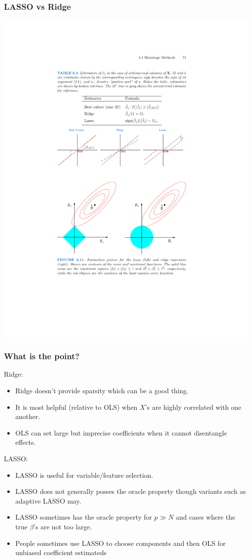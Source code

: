 \documentclass[xcolor=pdftex,dvipsnames,table,mathserif,aspectratio=169]{beamer}
\begin{document}
\begin{frame}
\frametitle{LASSO vs Ridge}
\begin{center}
\includegraphics[width=\textheight]{./resources/geometry}
\end{center}
\end{frame}

\begin{frame}
\frametitle{What is the point?}
Ridge:
\begin{itemize}
\item Ridge doesn't provide sparsity which can be a good thing.
\item It is most helpful (relative to OLS) when $X$'s are highly correlated with one another.
\item OLS can set large but imprecise coefficients when it cannot disentangle effects.
\end{itemize}
LASSO:
\begin{itemize}
\item LASSO is useful for variable/feature selection.
\item LASSO does not generally posses the \alert{oracle property} though variants such as \alert{adaptive LASSO} may.
\item LASSO sometimes has the oracle property for $p \gg N$ and cases where the true $\beta$'s are not too large.
\item People sometimes use LASSO to choose components and then OLS for unbiased coefficient estimateds
\end{itemize}
\end{frame}
\end{document}
